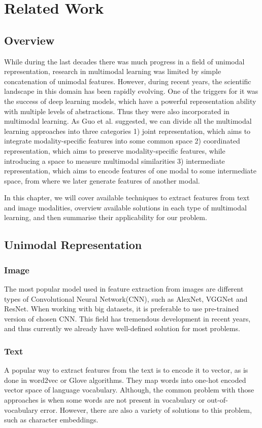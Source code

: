 \chapter{Related Work}
\section{Overview}
While during the last decades there was much progress in a field of unimodal representation, research in multimodal learning was limited by simple concatenation of unimodal features\cite{ref_survey_2015}. However, during recent years, the scientific landscape in this domain has been rapidly evolving\cite{ref_survey_baltrusaitis}. One of the triggers for it was the success of deep learning models, which have a powerful representation ability with multiple levels of abstractions. Thus they were also incorporated in multimodal learning. As Guo et al. suggested\cite{ref_survey}, we can divide all the multimodal learning approaches into three categories 1) joint representation, which aims to integrate modality-specific features into some common space 2) coordinated representation, which aims to preserve modality-specific features, while introducing a space to measure multimodal similarities  3) intermediate representation, which aims to encode features of one modal to some intermediate space, from where we later generate features of another modal.

In this chapter, we will cover available techniques to extract features from text and image modalities, overview available solutions in each type of multimodal learning, and then summarise their applicability for our problem.

\section{Unimodal Representation}
\subsection{Image}
The most popular model used in feature extraction from images are different types of Convolutional Neural Network(CNN), such as AlexNet\cite{ref_AlexNet}, VGGNet\cite{ref_VGGNet} and ResNet\cite{ref_ResNet}. When working with big datasets, it is preferable to use pre-trained version of chosen CNN. This field has tremendous development in recent years, and thus currently we already have well-defined solution for most problems.

\subsection{Text}
A popular way to extract features from the text is to encode it to vector, as is done in word2vec\cite{ref_word2vec} or Glove\cite{ref_glove} algorithms. They map words into one-hot encoded vector space of language vocabulary. Although, the common problem with those approaches is when some words are not present in vocabulary or out-of-vocabulary error. However, there are also a variety of solutions to this problem, such as character embeddings\cite{ref_char_embeddings}. 

